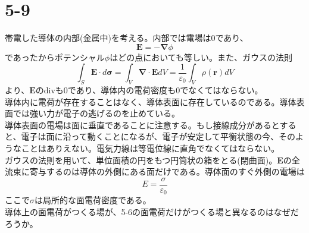 \documentclass{jsarticle}
\begin{document}
\section*{5-9}
\noindent
帯電した導体の内部(金属中)を考える。内部では電場は0であり、
\[\bm{E}=-\bm{\nabla}\phi\]
であったからポテンシャル\(\phi\)はどの点においても等しい。また、ガウスの法則
\[\int_{S}\bm{E}\cdot d\bm{\sigma}=\int_{V}\bm{\nabla}\cdot \bm{E}dV=\frac{1}{\varepsilon_{0}}\int_{V}\rho(\bm{r})dV\]
より、\(\bm{E}\)のdivも0であり、導体内の電荷密度も0でなくてはならない。\\
導体内に電荷が存在することはなく、導体表面に存在しているのである。導体表面では強い力が電子の逃げるのを止めている。\\
導体表面の電場は面に垂直であることに注意する。もし接線成分があるとすると、電子は面に沿って動くことになるが、電子が安定して平衡状態の今、そのようなことはありえない。電気力線は等電位線に直角でなくてはならない。\\
ガウスの法則を用いて、単位面積の円をもつ円筒状の箱をとる(閉曲面)。\(\bm{E}\)の全流束に寄与するのは導体の外側にある面だけである。導体面のすぐ外側の電場は
\[E=\frac{\sigma}{\varepsilon_{0}}\]
ここで\(\sigma\)は局所的な面電荷密度である。\\
導体上の面電荷がつくる場が、5-6の面電荷だけがつくる場と異なるのはなぜだろうか。\\
\\

\newpage
\end{document}
